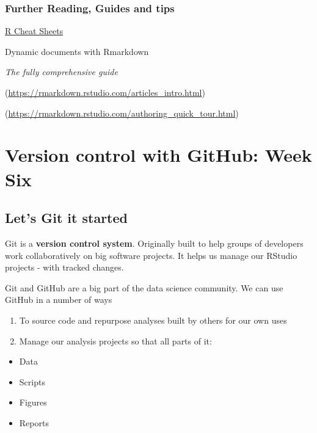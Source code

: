 \documentclass[
]{book}
\begin{document}
\hypertarget{further-reading-guides-and-tips-1}{%
\subsection{Further Reading, Guides and tips}\label{further-reading-guides-and-tips-1}}

\href{https://www.rstudio.com/resources/cheatsheets/}{R Cheat Sheets}

\citet{xie2015} Dynamic documents with Rmarkdown

\emph{The fully comprehensive guide}

(\url{https://rmarkdown.rstudio.com/articles_intro.html})

(\url{https://rmarkdown.rstudio.com/authoring_quick_tour.html})

\hypertarget{version-control-with-github-week-six}{%
\chapter{Version control with GitHub: Week Six}\label{version-control-with-github-week-six}}

\hypertarget{lets-git-it-started}{%
\section{Let's Git it started}\label{lets-git-it-started}}

Git is a \textbf{version control system}. Originally built to help groups of developers work collaboratively on big software projects. It helps us manage our RStudio projects - with tracked changes.

Git and GitHub are a big part of the data science community. We can use GitHub in a number of ways

\begin{enumerate}
\def\labelenumi{\arabic{enumi})}
\item
  To source code and repurpose analyses built by others for our own uses
\item
  Manage our analysis projects so that all parts of it:
\end{enumerate}

\begin{itemize}
\item
  Data
\item
  Scripts
\item
  Figures
\item
  Reports
\end{itemize}
\end{document}
